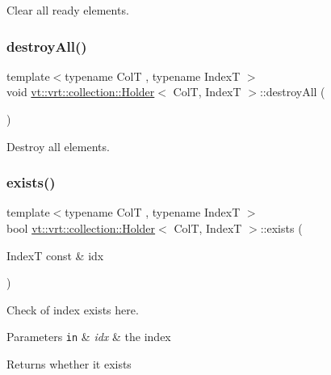 Clear all ready elements. 

\mbox{\label{structvt_1_1vrt_1_1collection_1_1_holder_ae4bd4f8f82713c8b4b2ea0b472fe7192}} 
\subsubsection{\texorpdfstring{destroy\+All()}{destroyAll()}}
{\footnotesize\ttfamily template$<$typename ColT , typename IndexT $>$ \\
void \hyperlink{structvt_1_1vrt_1_1collection_1_1_holder}{vt\+::vrt\+::collection\+::\+Holder}$<$ ColT, IndexT $>$\+::destroy\+All (\begin{DoxyParamCaption}{ }\end{DoxyParamCaption})}



Destroy all elements. 

\mbox{\label{structvt_1_1vrt_1_1collection_1_1_holder_a15b1f2f386c124191f01400fecf24464}} 
\subsubsection{\texorpdfstring{exists()}{exists()}}
{\footnotesize\ttfamily template$<$typename ColT , typename IndexT $>$ \\
bool \hyperlink{structvt_1_1vrt_1_1collection_1_1_holder}{vt\+::vrt\+::collection\+::\+Holder}$<$ ColT, IndexT $>$\+::exists (\begin{DoxyParamCaption}\item[{IndexT const \&}]{idx }\end{DoxyParamCaption})}



Check of index exists here. 


\begin{DoxyParams}[1]{Parameters}
\mbox{\tt in}  & {\em idx} & the index\\
\hline
\end{DoxyParams}
\begin{DoxyReturn}{Returns}
whether it exists 
\end{DoxyReturn}
\mbox{\label{structvt_1_1vrt_1_1collection_1_1_holder_a9cd9b190a9e1cf6726c520623a2ff4d2}} 
